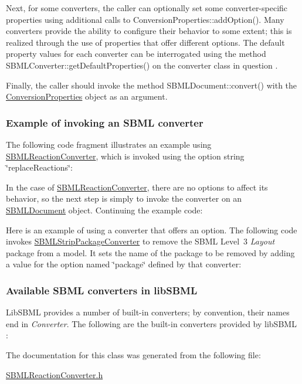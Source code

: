 Next, for some converters, the caller can optionally set some converter-\/specific properties using additional calls to Conversion\+Properties\+::add\+Option(). Many converters provide the ability to configure their behavior to some extent; this is realized through the use of properties that offer different options. The default property values for each converter can be interrogated using the method S\+B\+M\+L\+Converter\+::get\+Default\+Properties() on the converter class in question .

Finally, the caller should invoke the method S\+B\+M\+L\+Document\+::convert() with the \hyperlink{class_conversion_properties}{Conversion\+Properties} object as an argument.\hypertarget{classdoc__section__using__sbml__converters_converter-example}{}\subsubsection{Example of invoking an S\+B\+M\+L converter}\label{classdoc__section__using__sbml__converters_converter-example}
The following code fragment illustrates an example using \hyperlink{class_s_b_m_l_reaction_converter}{S\+B\+M\+L\+Reaction\+Converter}, which is invoked using the option string {\ttfamily \char`\"{}replace\+Reactions\char`\"{}}\+:

In the case of \hyperlink{class_s_b_m_l_reaction_converter}{S\+B\+M\+L\+Reaction\+Converter}, there are no options to affect its behavior, so the next step is simply to invoke the converter on an \hyperlink{class_s_b_m_l_document}{S\+B\+M\+L\+Document} object. Continuing the example code\+:

Here is an example of using a converter that offers an option. The following code invokes \hyperlink{class_s_b_m_l_strip_package_converter}{S\+B\+M\+L\+Strip\+Package\+Converter} to remove the S\+B\+ML Level~3 {\itshape Layout} package from a model. It sets the name of the package to be removed by adding a value for the option named {\ttfamily \char`\"{}package\char`\"{}} defined by that converter\+:\hypertarget{classdoc__section__using__sbml__converters_available-converters}{}\subsubsection{Available S\+B\+M\+L converters in lib\+S\+B\+ML}\label{classdoc__section__using__sbml__converters_available-converters}
Lib\+S\+B\+ML provides a number of built-\/in converters; by convention, their names end in {\itshape Converter}. The following are the built-\/in converters provided by lib\+S\+B\+ML \+:

The documentation for this class was generated from the following file\+:\begin{DoxyCompactItemize}
\item 
\hyperlink{_s_b_m_l_reaction_converter_8h}{S\+B\+M\+L\+Reaction\+Converter.\+h}\end{DoxyCompactItemize}

